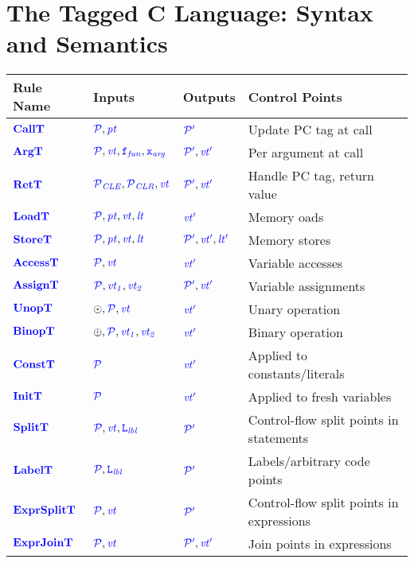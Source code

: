 \documentclass{llncs}
\begin{document}
\section{The Tagged C Language: Syntax and Semantics}
\label{sec:language}

\begin{table}[t]
  \begin{tabular}{|l|l|l|l|}
    \hline
    Rule Name & Inputs & Outputs & Control Points \\
    \hline
    \(\calltname\)      & \(\calltargs\)         & \(\calltres\)      & Update PC tag at call \\
    \(\argtname\)       & \(\argtargs\)          & \(\argtres\)       & Per argument at call \\
    \(\rettname\)       & \(\rettargs\)          & \(\rettres\)       & Handle PC tag, return value \\
    \(\loadtname\)      & \(\loadtargs\)         & \(\loadtres\)      & Memory oads \\
    \(\storetname\)     & \(\storetargs\)        & \(\storetres\)     & Memory stores \\
    \(\accesstname\)    & \(\accesstargs\)       & \(\accesstres\)    & Variable accesses \\
    \(\assigntname\)    & \(\assigntargs\)       & \(\assigntres\)    & Variable assignments \\
    \(\unoptname\)      & \(\unoptargs\)         & \(\unoptres\)      & Unary operation \\
    \(\binoptname\)     & \(\binoptargs\)        & \(\binoptres\)     & Binary operation \\
    \(\consttname\)     & \(\consttargs\)        & \(\consttres\)     & Applied to constants/literals \\
    \(\inittname\)      & \(\inittargs\)         & \(\inittres\)      & Applied to fresh variables \\
    \(\splittname\)     & \(\splittargs\)        & \(\splittres\)     & Control-flow split points in statements\\
    \(\labeltname\)     & \(\labeltargs\)        & \(\labeltres\)     & Labels/arbitrary code points \\
    \(\exprsplittname\) & \(\exprsplittargs\)    & \(\exprsplittres\) & Control-flow split points in expressions \\
    \(\exprjointname\)  & \(\exprjointargs\)     & \(\exprjointres\)  & Join points in expressions \\

\end{tabular}
\end{table}
\end{document}
